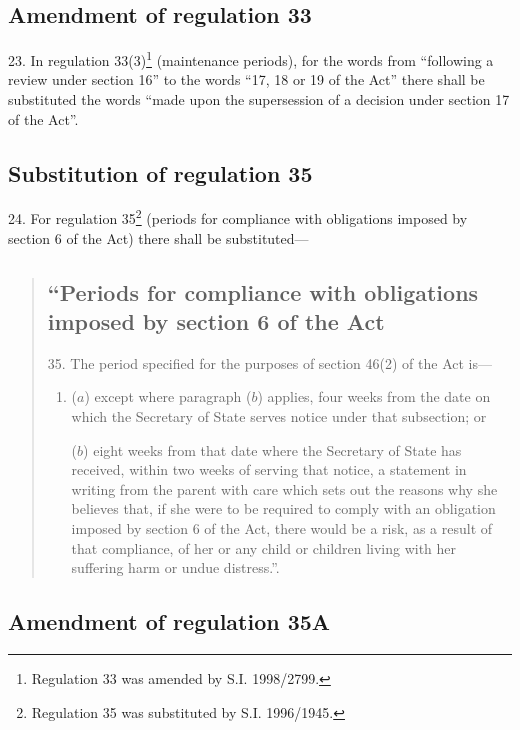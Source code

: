 \documentclass[12pt,a4paper]{article}
\begin{document}
\subsection[23. Amendment of regulation 33]{Amendment of regulation 33}

23.  In regulation 33(3)\footnote{\frenchspacing Regulation 33 was amended by S.I. 1998/2799.} (maintenance periods), for the words from “following a review under section 16” to the words “17, 18 or 19 of the Act” there shall be substituted the words “made upon the supersession of a decision under section 17 of the Act”.

\subsection[24. Substitution of regulation 35]{Substitution of regulation 35}

24.  For regulation 35\footnote{\frenchspacing Regulation 35 was substituted by S.I. 1996/1945.} (periods for compliance with obligations imposed by section 6 of the Act) there shall be substituted---
\begin{quotation}
\subsection*{“Periods for compliance with obligations imposed by section 6 of the Act}

35.  The period specified for the purposes of section 46(2) of the Act is---
\begin{enumerate}\item[]
($a$) except where paragraph ($b$) applies, four weeks from the date on which the Secretary of State serves notice under that subsection; or

($b$) eight weeks from that date where the Secretary of State has received, within two weeks of serving that notice, a statement in writing from the parent with care which sets out the reasons why she believes that, if she were to be required to comply with an obligation imposed by section 6 of the Act, there would be a risk, as a result of that compliance, of her or any child or children living with her suffering harm or undue distress.”.
\end{enumerate}
\end{quotation}

\subsection[25. Amendment of regulation 35A]{Amendment of regulation 35A}
\end{document}

